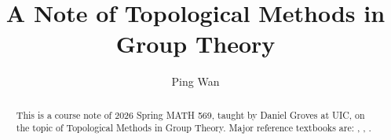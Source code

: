 \documentclass[12pt,oneside]{amsart}
\title{A Note of Topological Methods in Group Theory}
\author{Ping Wan}
\begin{document}
\begin{abstract}
    This is a course note of  2026 Spring MATH 569, taught by Daniel Groves at UIC, on the topic of Topological Methods in Group Theory. Major reference textbooks are: \cite{hatcher_algebraic_2001}, \cite{brown_cohomology_1982}, \cite{geoghegan_topological_2008}.
\end{abstract}
\maketitle


\tableofcontents

\newpage










% 





\end{document}
